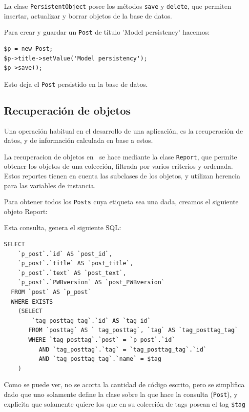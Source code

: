 La clase \verb'PersistentObject' posee los métodos \verb'save' y \verb'delete', que permiten insertar, actualizar y borrar objetos de la base de datos.

Para crear y guardar un \verb'Post' de título 'Model persistency' hacemos:

\begin{verbatim}
$p = new Post;
$p->title->setValue('Model persistency');
$p->save();
\end{verbatim}

Esto deja el \verb'Post' persistido en la base de datos.

\subsection{Recuperación de objetos}

Una operación habitual en el desarrollo de una aplicación, es la recuperación de datos, y de información calculada en base a estos.

La recuperacion de objetos en \PWB \ se hace mediante la clase \verb"Report", que permite obtener los objetos de una colección, filtrada por varios criterios y ordenada. Estos reportes tienen en cuenta las subclases de los objetos, y utilizan herencia para las variables de instancia.

Para obtener todos los \verb"Posts" cuya etiqueta sea una dada, creamos el siguiente objeto Report:

\begin{lgrind}

\end{lgrind}

Esta consulta, genera el siguiente SQL:

\begin{verbatim}
SELECT
    `p_post`.`id` AS `post_id`,
    `p_post`.`title` AS `post_title`,
    `p_post`.`text` AS `post_text`,
    `p_post`.`PWBversion` AS `post_PWBversion`
  FROM `post` AS `p_post`
  WHERE EXISTS
    (SELECT
        `tag_posttag_tag`.`id` AS `tag_id`
       FROM `posttag` AS ` tag_posttag`, `tag` AS `tag_posttag_tag`
       WHERE `tag_posttag`.`post` = `p_post`.`id`
          AND `tag_posttag`.`tag` = `tag_posttag_tag`.`id`
          AND `tag_posttag_tag`.`name` = $tag
    )
\end{verbatim}


Como se puede ver, no se acorta la cantidad de código escrito, pero se simplifica dado que uno solamente define la clase sobre la que hace la consulta (\verb"Post"), y explicita que solamente quiere los que en su colección de tags posean el tag \verb'$tag' %

